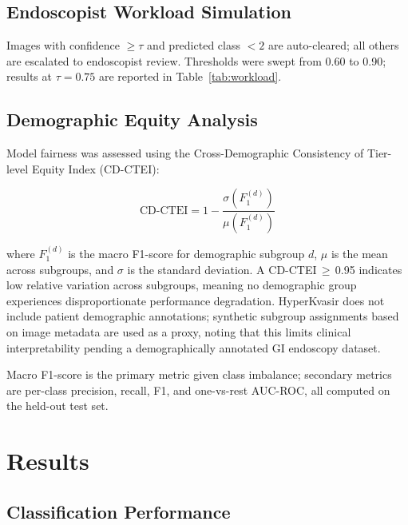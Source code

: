 \documentclass[11pt,a4paper]{article}
\begin{document}
\subsection{Endoscopist Workload Simulation}
\label{sec:workload}

Images with confidence $\geq\tau$ and predicted class $<2$ are auto-cleared;
all others are escalated to endoscopist review. Thresholds were swept from
0.60 to 0.90; results at $\tau=0.75$ are reported in Table~\ref{tab:workload}.

\subsection{Demographic Equity Analysis}
\label{sec:equity}

Model fairness was assessed using the Cross-Demographic Consistency of
Tier-level Equity Index (CD-CTEI):

\begin{equation}
  \text{CD-CTEI} = 1 - \frac{\sigma(F_1^{(d)})}{\mu(F_1^{(d)})}
  \label{eq:cdctei}
\end{equation}

where $F_1^{(d)}$ is the macro F1-score for demographic subgroup $d$,
$\mu$ is the mean across subgroups, and $\sigma$ is the standard deviation.
A CD-CTEI\,$\geq$\,0.95 indicates low relative variation across subgroups,
meaning no demographic group experiences disproportionate performance
degradation.
HyperKvasir does not include patient demographic annotations; synthetic
subgroup assignments based on image metadata are used as a proxy, noting
that this limits clinical interpretability pending a demographically annotated
GI endoscopy dataset.

Macro F1-score is the primary metric given class imbalance; secondary
metrics are per-class precision, recall, F1, and one-vs-rest AUC-ROC,
all computed on the held-out test set.

\section{Results}
\label{sec:results}

\subsection{Classification Performance}
\end{document}

